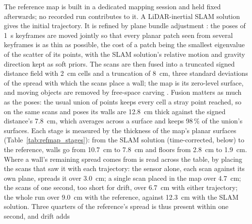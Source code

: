The reference map is built in a dedicated mapping session and held fixed
afterwards; no recorded run contributes to it. A LiDAR-inertial SLAM
solution \cite{glim} gives the initial trajectory. It is refined by plane
bundle adjustment \cite{balm,hba}: the poses of \SI{1}{\second} keyframes
are moved jointly so that every planar patch seen from several keyframes is
as thin as possible, the cost of a patch being the smallest eigenvalue of
the scatter of its points, with the SLAM solution's relative motion and
gravity direction kept as soft priors. The scans are then fused into a
truncated signed distance field \cite{curless1996,vdbfusion} with
\SI{2}{\centi\metre} cells and a truncation of \SI{8}{\centi\metre}, three
standard deviations of the spread with which the scans place a wall; the
map is its zero-level surface, and moving objects are removed by
free-space carving \cite{dufomap}. Fusion matters as much as the poses: the
usual union of points keeps every cell a stray point reached, so on the same
scans and poses its walls are \SI{12.8}{\centi\metre} thick against the
signed distance's \SI{7.8}{\centi\metre}, which averages across a surface
and keeps 98\,\% of the union's surfaces. Each stage is measured by the
thickness of the map's planar surfaces (Table~\ref{tab:refmap_stages}):
from the SLAM solution (time-corrected, below) to the reference, walls go
from \SI{10.7}{\centi\metre} to \SI{7.8}{\centi\metre} and floors from
\SI{2.8}{\centi\metre} to \SI{1.9}{\centi\metre}. Where a wall's remaining
spread comes from is read across the table, by placing the scans that saw
it with each trajectory: the sensor alone, each scan against its own
plane, spreads it over \SI{3.0}{\centi\metre}; a single scan placed in the
map over \SI{4.7}{\centi\metre}; the scans of one second, too
short for drift, over \SI{6.7}{\centi\metre} with either trajectory; the
whole run over \SI{9.0}{\centi\metre} with the reference, against
\SI{12.3}{\centi\metre} with the SLAM solution. Three quarters of the
reference's spread is thus present within one second, and drift adds
